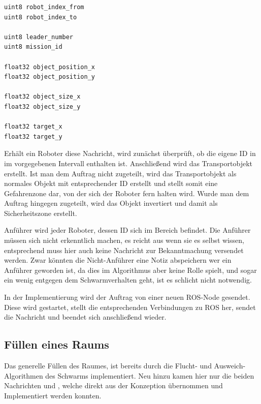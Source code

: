 \begin{lstlisting}[style=ros, title=Nachrichten-Typ: New\_Mission]
uint8 robot_index_from
uint8 robot_index_to

uint8 leader_number
uint8 mission_id

float32 object_position_x
float32 object_position_y

float32 object_size_x
float32 object_size_y

float32 target_x
float32 target_y
\end{lstlisting}

Erhält ein Roboter diese Nachricht, wird zunächst überprüft, ob die eigene ID in im vorgegebenen Intervall enthalten ist. Anschließend wird das Transportobjekt erstellt. Ist man dem Auftrag nicht zugeteilt, wird das Transportobjekt als normales Objekt mit entsprechender ID erstellt und stellt somit eine Gefahrenzone dar, von der sich der Roboter fern halten wird.
Wurde man dem Auftrag hingegen zugeteilt, wird das Objekt invertiert und damit als Sicherheitszone erstellt.

Anführer wird jeder Roboter, dessen ID sich im Bereich \highlight{[robot\_index\_from, robot\_index\_from + leader\_number[} befindet. Die Anführer müssen sich nicht erkenntlich machen, es reicht aus wenn sie es selbst wissen, entsprechend muss hier auch keine Nachricht zur Bekanntmachung versendet werden. Zwar könnten die Nicht-Anführer eine Notiz abspeichern wer ein Anführer geworden ist, da dies im Algorithmus aber keine Rolle spielt, und sogar ein wenig entgegen dem Schwarmverhalten geht, ist es schlicht nicht notwendig.

In der Implementierung wird der Auftrag von einer neuen ROS-Node gesendet. Diese wird gestartet, stellt die entsprechenden Verbindungen zu ROS her, sendet die Nachricht und beendet sich anschließend wieder.

\subsection*{Füllen eines Raums}

Das generelle Füllen des Raumes, ist bereits durch die Flucht- und Ausweich-Algorithmen des Schwarms implementiert. Neu hinzu kamen hier nur die beiden Nachrichten  und , welche direkt aus der Konzeption übernommen und Implementiert werden konnten.

